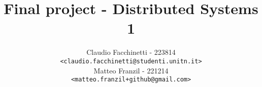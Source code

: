 \documentclass[a4paper]{article}
\begin{document}
\title{Final project - Distributed Systems 1}  
\author{Claudio Facchinetti - 223814 \\ \texttt{<claudio.facchinetti@studenti.unitn.it>}\\
Matteo Franzil - 221214 \\
\texttt{<matteo.franzil+github@gmail.com>}}

\maketitle





\end{document}
